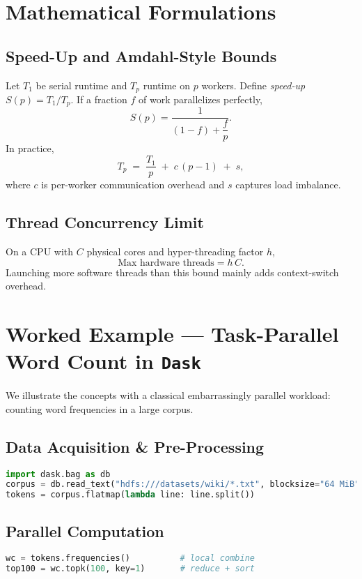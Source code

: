 \documentclass[11pt]{article}
\begin{document}
\section{Mathematical Formulations}

\subsection{Speed-Up and Amdahl-Style Bounds}
Let $T_1$ be serial runtime and $T_p$ runtime on $p$ workers.  
Define \emph{speed-up} $S(p)=T_1/T_p$.  If a fraction $f$ of work parallelizes perfectly,
\[
S(p)=\frac{1}{(1-f)+\dfrac{f}{p}}.
\]
In practice,
\[
T_p \;=\; \frac{T_1}{p}\;+\;c\,(p-1)\;+\;s,
\]
where $c$ is per-worker communication overhead and $s$ captures load imbalance.

\subsection{Thread Concurrency Limit}
On a CPU with $C$ physical cores and hyper-threading factor $h$,
\[
\text{Max hardware threads}=h\,C.
\]
Launching more software threads than this bound mainly adds context-switch overhead.

\section{Worked Example — Task-Parallel Word Count in \texttt{Dask}}

We illustrate the concepts with a classical embarrassingly parallel workload: counting word frequencies in a large corpus.

\subsection{Data Acquisition \& Pre-Processing}
\begin{lstlisting}[language=Python,caption={Load a ~2 GB corpus into Dask partitions.}]
import dask.bag as db
corpus = db.read_text("hdfs:///datasets/wiki/*.txt", blocksize="64 MiB")
tokens = corpus.flatmap(lambda line: line.split())
\end{lstlisting}

\subsection{Parallel Computation}
\begin{lstlisting}[language=Python,caption={Map → shuffle → reduce in Dask.}]
wc = tokens.frequencies()          # local combine
top100 = wc.topk(100, key=1)       # reduce + sort
\end{lstlisting}
\end{document}
